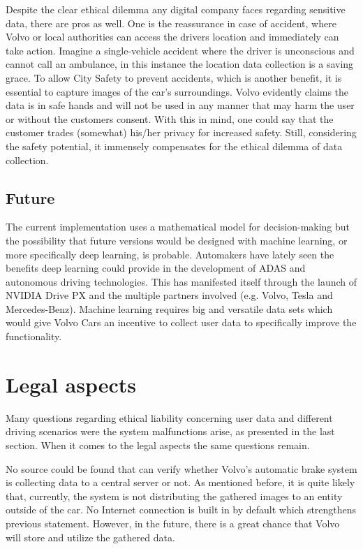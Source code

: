 \documentclass[conference]{IEEEtran}
\begin{document}
Despite the clear ethical dilemma any digital company faces regarding sensitive data, there are pros as well. One is the reassurance in case of accident, where Volvo or local authorities can access the drivers location and immediately can take action. Imagine a single-vehicle accident where the driver is unconscious and cannot call an ambulance, in this instance the location data collection is a saving grace. To allow City Safety to prevent accidents, which is another benefit, it is essential to capture images of the car's surroundings. Volvo evidently claims the data is in safe hands and will not be used in any manner that may harm the user or without the customers consent. \cite{PrivacyPolicy} With this in mind, one could say that the customer trades (somewhat) his/her privacy for increased safety. Still, considering the safety potential, it immensely compensates for the ethical dilemma of data collection.

\subsection{Future}
The current implementation uses a mathematical model for decision-making but the possibility that future versions would be designed with machine learning, or more specifically deep learning, is probable. Automakers have lately seen the benefits deep learning could provide in the development of ADAS and autonomous driving technologies. This has manifested itself through the launch of NVIDIA Drive PX and the multiple partners involved (e.g. Volvo, Tesla and Mercedes-Benz). \cite{DrivePX} Machine learning requires big and versatile data sets which would give Volvo Cars an incentive to collect user data to specifically improve the functionality.


\section{Legal aspects}
Many questions regarding ethical liability concerning user data and different driving scenarios were the system malfunctions arise, as presented in the last section. When it comes to the legal aspects the same questions remain.

No source could be found that can verify whether Volvo's automatic brake system is collecting data to a central server or not. As mentioned before, it is quite likely that, currently, the system is not distributing the gathered images to an entity outside of the car. No Internet connection is built in by default which strengthens previous statement. \cite{SensusConnect} However, in the future, there is a great chance that Volvo will store and utilize the gathered data.
\end{document}
